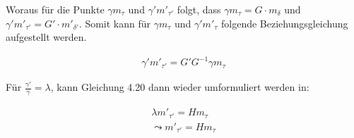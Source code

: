 % 
% 
 
Woraus für die Punkte $\gamma m_\tau$ und $\gamma' m'_{\tau'}$ folgt, dass $\gamma m_\tau = G\cdot m_\delta$ und $\gamma' m'_{\tau'} = G'\cdot m'_{\delta'}$\cite{Elements}. Somit kann für $\gamma m_\tau$ und $\gamma' m'_{\tau}$ folgende Beziehungsgleichung aufgestellt werden\cite{Elements}.
 
 \begin{gather}
 	\gamma' m'_{\tau'} = G' G^{-1} \gamma m_\tau
 \end{gather}
 
 Für $\frac{\gamma'}{\gamma} = \lambda$, kann Gleichung 4.20 dann wieder umformuliert werden in:
 
 \begin{gather}
 	\lambda m'_{\tau'} = H m_\tau\\
 	\leadsto m'_{\tau'} = H m_\tau
 \end{gather} 
 
